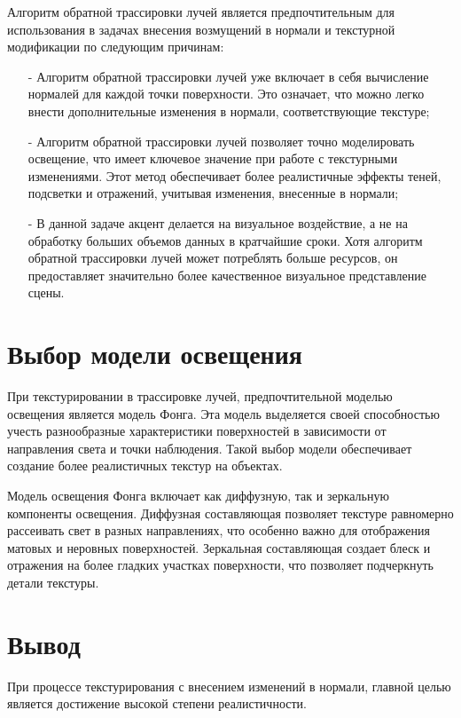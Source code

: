 Алгоритм обратной трассировки лучей является предпочтительным для использования в задачах внесения возмущений в нормали и текстурной модификации по следующим причинам:
\begin{itemize}[label=\arabic*)]
	\item[-] Алгоритм обратной трассировки лучей уже включает в себя вычисление нормалей для каждой точки поверхности. Это означает, что можно легко внести дополнительные изменения в нормали, соответствующие текстуре;
	\item[-] Алгоритм обратной трассировки лучей позволяет точно моделировать освещение, что имеет ключевое значение при работе с текстурными изменениями. Этот метод обеспечивает более реалистичные эффекты теней, подсветки и отражений, учитывая изменения, внесенные в нормали;
	\item[-] В данной задаче акцент делается на визуальное воздействие, а не на обработку больших объемов данных в кратчайшие сроки. Хотя алгоритм обратной трассировки лучей может потреблять больше ресурсов, он предоставляет значительно более качественное визуальное представление сцены.
\end{itemize}

\section{Выбор модели освещения}

При текстурировании в трассировке лучей, предпочтительной моделью освещения является модель Фонга. Эта модель выделяется своей способностью учесть разнообразные характеристики поверхностей в зависимости от направления света и точки наблюдения. Такой выбор модели обеспечивает создание более реалистичных текстур на объектах.

Модель освещения Фонга включает как диффузную, так и зеркальную компоненты освещения. Диффузная составляющая позволяет текстуре равномерно рассеивать свет в разных направлениях, что особенно важно для отображения матовых и неровных поверхностей. Зеркальная составляющая создает блеск и отражения на более гладких участках поверхности, что позволяет подчеркнуть детали текстуры.

\section*{Вывод}

При процессе текстурирования с внесением изменений в нормали, главной целью является достижение высокой степени реалистичности.

